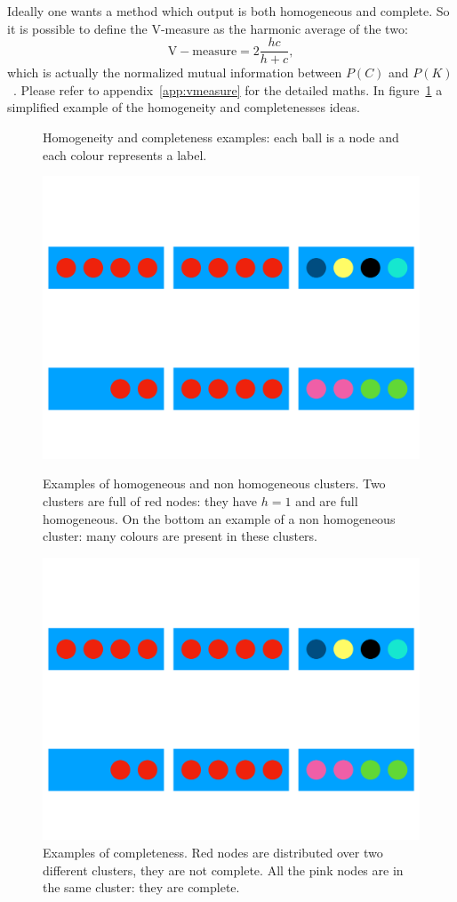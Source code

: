 Ideally one wants a method which output is both homogeneous and complete. So it is possible to define the V-measure as the harmonic average of the two:
\begin{equation}\label{eq:mutualinformation}
    \mathrm{V-measure}=2\frac{h c}{h + c},
\end{equation}
which is actually the normalized mutual information between $P(C)$ and $P(K)$~\cite{rosenberg2007v}. Please refer to appendix~\ref{app:vmeasure} for the detailed maths. In figure~\ref{fig:topic/hc} a simplified example of the homogeneity and completenesses ideas.
\begin{figure}[htb!]
	\caption{Homogeneity and completeness examples: each ball is a node and each colour represents a label.}
	\label{fig:topic/hc}
	\begin{minipage}{0.5\linewidth}
		\includegraphics[page=2,width=0.8\linewidth]{pictures/topic/hc.pdf}
		\caption{Examples of homogeneous and non homogeneous clusters. Two clusters are full of red nodes: they have $h=1$ and are full homogeneous. On the bottom an example of a non homogeneous cluster: many colours are present in these clusters.}
	\end{minipage}
\hspace{2mm}
	\begin{minipage}{0.5\linewidth}
	\includegraphics[page=3,width=0.8\linewidth]{pictures/topic/hc.pdf}
			\caption{Examples of completeness. Red nodes are distributed over two different clusters, they are not complete. All the pink nodes are in the same cluster: they are complete.\\}
\end{minipage}
\end{figure}

